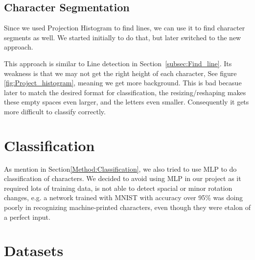 \documentclass[Report.tex]{subfiles}
\begin{document}
\begin{flushleft}
\end{flushleft}


\subsection{Character Segmentation}
\begin{flushleft}
Since we used Projection Histogram to find lines, we can use it to find character segments as well. We started initially to do that, but later switched to the new approach. \par
This approach is similar to Line detection in Section~\ref{subsec:Find_line}. Its weakness is that we may not get the right height of each character, See figure \ref{fig:Project_histogram}, meaning we get more background. This is bad becasue later to match the desired format for classification, the resizing/reshaping makes these empty spaces even larger, and the letters even smaller. Consequently it gets more difficult to classify correctly.
\end{flushleft}

\section{Classification}
\label{sec:Discarded Method:Classification}
\begin{flushleft}
  As mention in Section\ref{Method:Classification}, we also tried to use MLP to do classification of characters.
  We decided to avoid using MLP in our project as it required lots of training data, is not able to detect spacial or minor rotation changes, e.g. a network trained with MNIST with accuracy over 95\% was doing poorly in recognizing machine-printed characters, even though they were etalon of a perfect input.
\end{flushleft}

\section{Datasets}
\label{sec:Datasets}

\end{document}
